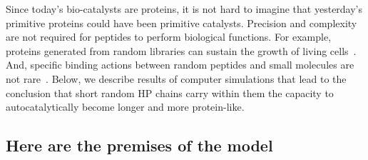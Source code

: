 \documentclass[journal=jacsat,manuscript=article,layout=twocolumn]{achemso}
\begin{document}
 Since today's bio-catalysts are proteins, it is not hard to imagine that yesterday's primitive 
proteins could have been primitive catalysts.  Precision and complexity are not required for 
peptides to perform biological functions. For example, proteins generated from random libraries can 
sustain the growth of living cells~\cite{Fisher2011}.  And, specific binding actions between random 
peptides and small molecules are not rare~\cite{Cherny2012}.  Below, we describe results of 
computer simulations that lead to 
the conclusion that short random HP chains carry within them the capacity to autocatalytically 
become longer and more protein-like.  

\subsection{Here are the premises of the model}
 
\end{document}
